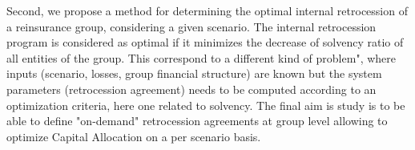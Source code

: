 Second, we propose a method for determining the optimal internal retrocession of a reinsurance group, considering a given scenario. The internal retrocession program is considered as optimal if it minimizes the decrease of solvency ratio of all entities of the group. This correspond to a different kind of problem", where inputs (scenario, losses, group financial structure) are known but the system parameters (retrocession agreement) needs to be computed according to an optimization criteria, here one related to solvency. The final aim is study is to be able to define "on-demand" retrocession agreements at group level allowing to optimize Capital Allocation on a per scenario basis.
